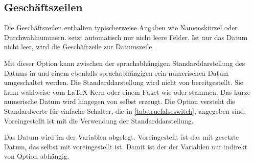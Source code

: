 \subsection{Geschäftszeilen}
%
\BeginIndexGroup
{}%

\iftrue %
Die Geschäftszeilen enthalten typischerweise Angaben wie Namenskürzel oder
Durchwahlnummern. \KOMAScript{} setzt automatisch nur nicht leere Felder. Ist
nur das Datum nicht leer, wird die Geschäftzeile zur Datumszeile.
\else%
Die Geschäftszeile kann auch länger als eine Zeile sein. Sie wird nur gesetzt,
wenn mindestens eine der Variablen für die Geschäftszeile nicht leer ist.  Es
werden nur nicht leere Felder gesetzt. Um\textnote{Tipp!} ein scheinbar leeres
Feld zu setzen, kann man einen scheinbar leeren Variableninhalt wie
\Macro{mbox}\Parameter{} verwenden. Wird auf die Geschäftszeile verzichtet, so
werden an ihrer Stelle Bezeichnung und Inhalt der Variablen
\DescRef{\LabelBase.variable.date} ausgegeben. %
%
\fi

\begin{Declaration}
\end{Declaration}
Mit dieser Option kann zwischen der sprachabhängigen Standarddarstellung des
Datums in
 und einem
ebenfalls sprachabhängigen rein numerischen Datum umgeschaltet werden. Die
Standarddarstellung wird nicht von \KOMAScript{} bereitgestellt. Sie kann
wahlweise vom \LaTeX-Kern oder einem Paket wie
 oder
stammen. Das kurze numerische
Datum wird hingegen von  selbst erzeugt. Die Option versteht
die Standardwerte für einfache Schalter, die in \autoref{tab:truefalseswitch},
 angegeben
sind. Voreingestellt ist mit  die
Verwendung der Standarddarstellung.

\begin{Declaration}
\end{Declaration}
Das Datum %
wird im  der Variablen 
abgelegt. Voreingestellt ist das mit
 gesetzte Datum, das selbst mit
voreingestellt ist. Damit ist der  der Variablen nur indirekt
von Option %
 abhängig.

